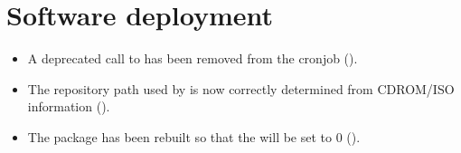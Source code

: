 \section{Software deployment}
\begin{itemize}
\item A deprecated call to  has been
  removed from the  cronjob
  ().
\item The repository path used by
   is now correctly determined
  from CDROM/ISO information ().
\item The package  has been rebuilt
  so that the   will be set to 0 ().
\end{itemize}

